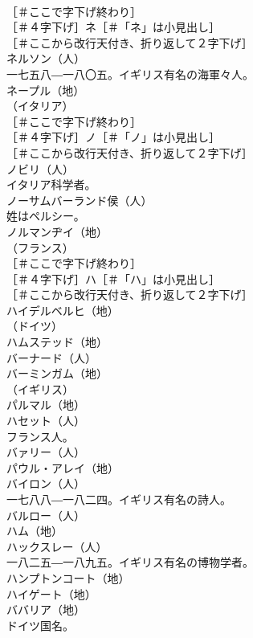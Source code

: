 \documentclass[8pt]{extreport}
\begin{document}
\begin{CJK}{UTF8}{min}
\\	［＃ここで字下げ終わり］
\\	［＃４字下げ］ネ［＃「ネ」は小見出し］
\\	［＃ここから改行天付き、折り返して２字下げ］
\\	ネルソン（人）
\\	一七五八―一八〇五。イギリス有名の海軍々人。
\\	ネープル（地）
\\	（イタリア）
\\	［＃ここで字下げ終わり］
\\	［＃４字下げ］ノ［＃「ノ」は小見出し］
\\	［＃ここから改行天付き、折り返して２字下げ］
\\	ノビリ（人）
\\	イタリア科学者。
\\	ノーサムバーランド侯（人）
\\	姓はペルシー。
\\	ノルマンヂイ（地）
\\	（フランス）
\\	［＃ここで字下げ終わり］
\\	［＃４字下げ］ハ［＃「ハ」は小見出し］
\\	［＃ここから改行天付き、折り返して２字下げ］
\\	ハイデルベルヒ（地）
\\	（ドイツ）
\\	ハムステッド（地）
\\	バーナード（人）
\\	バーミンガム（地）
\\	（イギリス）
\\	パルマル（地）
\\	ハセット（人）
\\	フランス人。
\\	バァリー（人）
\\	パウル・アレイ（地）
\\	バイロン（人）
\\	一七八八―一八二四。イギリス有名の詩人。
\\	バルロー（人）
\\	ハム（地）
\\	ハックスレー（人）
\\	一八二五―一八九五。イギリス有名の博物学者。
\\	ハンプトンコート（地）
\\	ハイゲート（地）
\\	ババリア（地）
\\	ドイツ国名。

\end{CJK}
\end{document}

